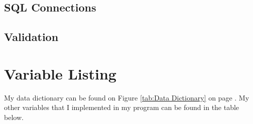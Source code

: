 \subsection{SQL Connections}

\subsection{Validation}











\section{Variable Listing}

My data dictionary can be found on Figure \ref{tab:Data Dictionary} on page \pageref{tab:Data Dictionary}. My other variables that I implemented in my program can be found in the table below.

